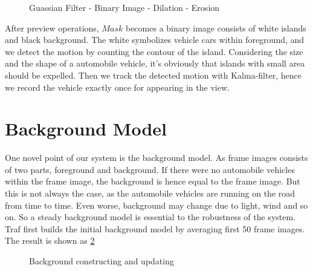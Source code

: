 \documentclass[draftclsnofoot,onecolumn]{IEEEtran}
\begin{document}
	\begin{figure}[!h]
	\centering
	\caption{Guassian Filter - Binary Image - Dilation - Erosion}
	\label{fig:preDetection}
	\end{figure}
	
	After preview operations, $Mask$ becomes a binary image consists of white islands and black background. The white symbolizes vehicle cars within foreground, and we detect the motion by counting the contour of the island. Considering the size and the shape of a automobile vehicle, it's obviously that islands with small area should be expelled. Then we track the detected motion with Kalma-filter, hence we record the vehicle exactly once for appearing in the view.

\section{Background Model}

One novel point of our system is the background model. As frame images consists of two parts, foreground and background. If there were no automobile vehicles within the frame image, the background is hence equal to the frame image. But this is not always the case, as the automobile vehicles are running on the road from time to time. Even worse, background may change due to light, wind and so on. So a steady background model is essential to the robustness of the system.
	Traf first builds the initial background model by averaging first 50 frame images. The result is shown as \ref{fig:background}
	\begin{figure}
	\label{fig:background}
	\caption{Background constructing and updating}
	\end{figure}
	
\end{document}
